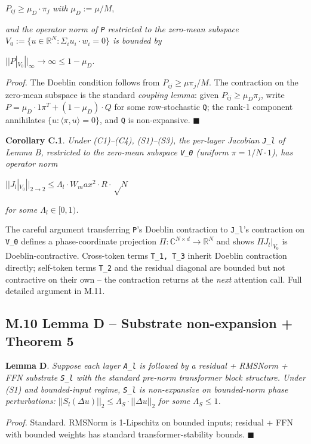 \documentclass[11pt,a4paper]{article}
\theoremstyle{plain}
\theoremstyle{definition}
\begin{document}
$P_{ij} \ge  \mu _D \cdot  \pi _j$ \emph{with} $\mu _D := \mu  / M$,

\emph{and the operator norm of \texttt{P} restricted to the zero-mean subspace $V_0 := \{u \in  \mathbb{R}^N : \Sigma _i u_i \cdot  w_i = 0\}$ is bounded by}

$||P|_{V_0}||_\infty  \to  \infty  \le  1 - \mu _D$.

\emph{Proof.} The Doeblin condition follows from $P_{ij} \ge  \mu  \pi _j / M$. The contraction on the zero-mean subspace is the standard \emph{coupling lemma}: given $P_{ij} \ge  \mu _D \pi _j$, write $P = \mu _D \cdot  1 \pi ^T + (1 - \mu _D) \cdot  Q$ for some row-stochastic \texttt{Q}; the rank-1 component annihilates $\{u : \langle \pi , u\rangle  = 0\}$, and \texttt{Q} is non-expansive. $\blacksquare$

\textbf{Corollary C.1}. \emph{Under (C1)--(C4), (S1)--(S3), the per-layer Jacobian \texttt{J\_l} of Lemma B, restricted to the zero-mean subspace \texttt{V\_0} (uniform $\pi  = 1/N \cdot  1$), has operator norm}

$|| J_l |_{V_0} ||_{2 \to  2} \le  \Lambda _l \cdot  W_max^2 \cdot  R \cdot  √N$

\emph{for some $\Lambda _l \in  [0, 1)$.}

The careful argument transferring \texttt{P}'s Doeblin contraction to \texttt{J\_l}'s contraction on \texttt{V\_0} defines a phase-coordinate projection $\Pi  : \mathbb{C}^{N\times d} \to  \mathbb{R}^N$ and shows $\Pi  J_l |_{V_0}$ is Doeblin-contractive. Cross-token terms \texttt{T\_1, T\_3} inherit Doeblin contraction directly; self-token terms \texttt{T\_2} and the residual diagonal are bounded but not contractive on their own -- the contraction returns at the \emph{next} attention call. Full detailed argument in M.11.

\subsection{M.10 Lemma D -- Substrate non-expansion + Theorem 5}
\textbf{Lemma D}. \emph{Suppose each layer \texttt{A\_l} is followed by a residual + RMSNorm + FFN substrate \texttt{S\_l} with the standard pre-norm transformer block structure. Under (S1) and bounded-input regime, \texttt{S\_l} is non-expansive on bounded-norm phase perturbations: $||S_l(\Delta u)||_2 \le  \Lambda _S \cdot  ||\Delta u||_2$ for some $\Lambda _S \le  1$.}

\emph{Proof.} Standard. RMSNorm is 1-Lipschitz on bounded inputs; residual + FFN with bounded weights has standard transformer-stability bounds. $\blacksquare$
\end{document}
